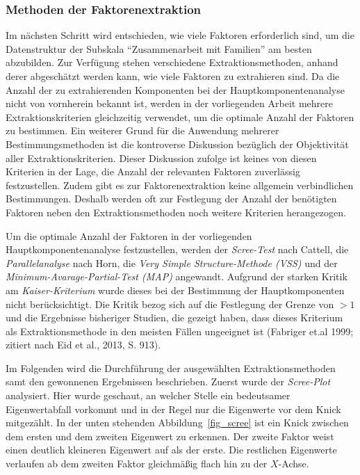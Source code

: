 \documentclass[12pt,a4paper]{article}
\begin{document}
\subsubsection{Methoden der Faktorenextraktion}
Im nächsten Schritt wird entschieden, wie viele Faktoren erforderlich sind, um die Datenstruktur der Subskala "`Zusammenarbeit mit Familien"' am besten abzubilden. Zur Verfügung stehen verschiedene Extraktionsmethoden, anhand derer abgeschätzt werden kann, wie viele Faktoren zu extrahieren sind. Da die Anzahl der zu extrahierenden Komponenten bei der Hauptkomponentenanalyse nicht von vornherein bekannt ist, werden in der vorliegenden Arbeit mehrere Extraktionskriterien gleichzeitig verwendet, um die optimale Anzahl der Faktoren zu bestimmen. Ein weiterer Grund für die Anwendung mehrerer Bestimmungsmethoden ist die kontroverse Diskussion bezüglich der Objektivität aller Extraktionskriterien. Dieser Diskussion zufolge ist keines von diesen Kriterien in der Lage, die Anzahl der relevanten Faktoren zuverlässig festzustellen. Zudem gibt es zur Faktorenextraktion keine allgemein verbindlichen Bestimmungen. Deshalb werden oft zur Festlegung der Anzahl der benötigten Faktoren neben den Extraktionsmethoden noch weitere Kriterien herangezogen.

	Um die optimale Anzahl der Faktoren in der vorliegenden Hauptkomponentenanalyse festzustellen, werden der \textit{Scree-Test} nach Cattell, die \textit{Parallelanalyse} nach Horn, die \textit{Very Simple Structure-Methode (VSS)} und der \textit{Minimum-Avarage-Partial-Test (MAP)} angewandt. Aufgrund der starken Kritik am \textit{Kaiser-Kriterium} wurde dieses bei der Bestimmung der Hauptkomponenten nicht berücksichtigt. Die Kritik bezog sich auf die Festlegung der Grenze von $>1$ und die Ergebnisse bisheriger Studien, die gezeigt haben, dass dieses Kriterium als Extraktionsmethode in den meisten Fällen ungeeignet ist (Fabriger et.al 1999; zitiert nach Eid et al., 2013, S. 913).
	
	Im Folgenden wird die Durchführung der ausgewählten Extraktionsmethoden samt den gewonnenen Ergebnissen beschrieben. Zuerst wurde der \textit{Scree-Plot} analysiert. Hier wurde geschaut, an welcher Stelle ein bedeutsamer Eigenwertabfall vorkommt und in der Regel nur die Eigenwerte vor dem Knick mitgezählt. In der unten stehenden Abbildung~\ref{fig_scree} ist ein Knick zwischen dem ersten und dem zweiten Eigenwert zu erkennen. Der zweite Faktor weist einen deutlich kleineren Eigenwert auf als der erste. Die restlichen Eigenwerte verlaufen ab dem zweiten Faktor gleichmäßig flach hin zu der $X$-Achse.
	
\end{document}
